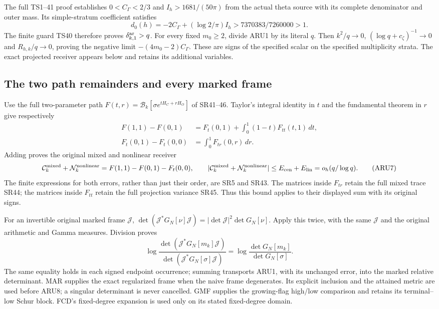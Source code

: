 The full TS1--41 proof establishes $0<C_\Gamma<2/3$ and
$I_h>1681/(50\pi)$ from the actual theta source with its complete
denominator and outer mass. Its simple-stratum coefficient satisfies
\[
 d_0(h)=-2C_\Gamma+(\log2/\pi)I_h
       >7370383/7260000>1.
 \tag{ARU5}
\]
The finite guard TS40 therefore proves $\delta_{k,1}^{\rm ar}>q$.
For every fixed $m_0\ge2$, divide ARU1 by its literal $q$.
Then $k^2/q\to0$, $(\log q+c_\zeta)^{-1}\to0$ and
$R_{h,k}/q\to0$, proving the negative limit
$-(4m_0-2)C_\Gamma$. These are signs of the specified scalar on the
specified multiplicity strata. The exact projected receiver appears
below and retains its additional variables.

\subsection{The two path remainders and every marked frame}
Use the full two-parameter path
$F(t,r)=\mathcal B_k[\sigma e^{tH_C+rH_O}]$ of SR41--46.
Taylor's integral identity in $t$ and the fundamental theorem in $r$
give respectively
\[
\begin{split}
 F(1,1)-F(0,1)&=F_t(0,1)+
                  \int_0^1(1-t)F_{tt}(t,1)\,dt,\\
 F_t(0,1)-F_t(0,0)&=\int_0^1F_{tr}(0,r)\,dr.
\end{split}\tag{ARU6}
\]
Adding proves the original mixed and nonlinear receiver
\[
 \mathcal C_k^{\rm mixed}+\mathcal N_k^{\rm nonlinear}
 =F(1,1)-F(0,1)-F_t(0,0),\qquad
 |\mathcal C_k^{\rm mixed}+\mathcal N_k^{\rm nonlinear}|
 \le E_{\rm cen}+E_{\rm lin}=o_h(q/\log q).
 \tag{ARU7}
\]
The finite expressions for both errors, rather than just their order,
are SR5 and SR43. The matrices inside $F_{tr}$ retain the full
mixed trace SR44; the matrices inside $F_{tt}$ retain the full
projection variance SR45. Thus this bound applies to their displayed
sum with its original signs.

For an invertible original marked frame $\mathcal J$,
$\det(\mathcal J^*G_N[\nu]\mathcal J)=
 |\det\mathcal J|^2\det G_N[\nu]$. Apply this twice, with the same
$\mathcal J$ and the original arithmetic and Gamma measures. Division
proves
\[
 \log\frac{\det(\mathcal J^*G_N[m_k]\mathcal J)}
                 {\det(\mathcal J^*G_N[\sigma]\mathcal J)}
 =\log\frac{\det G_N[m_k]}{\det G_N[\sigma]}.
 \tag{ARU8}
\]
The same equality holds in each signed endpoint occurrence; summing
transports ARU1, with its unchanged error, into the marked relative
determinant. MAR supplies the exact regularized frame when the naive
frame degenerates. Its explicit inclusion and the attained metric are
used before ARU8; a singular determinant is never cancelled.
GMF supplies the growing-flag high/low comparison and retains its
terminal--low Schur block. FCD's fixed-degree expansion is used only
on its stated fixed-degree domain.

